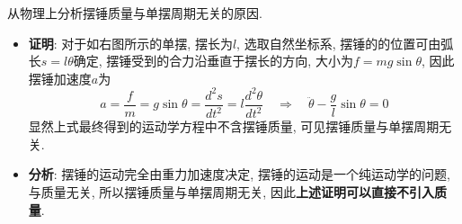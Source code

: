 \begin{problem}[04]
从物理上分析摆锤质量与单摆周期无关的原因.
\end{problem}
\begin{solution}
\begin{minipage}[c]{0.8\linewidth}
\begin{itemize}
\item \textbf{证明}: 对于如右图所示的单摆, 摆长为$l$, 选取自然坐标系, 摆锤的的位置可由弧长$s=l\theta$确定, 摆锤受到的合力沿垂直于摆长的方向, 大小为$f = mg\sin\theta$, 因此摆锤加速度$a$为
\[
a = \frac{f}{m} = g\sin\theta = \frac{d^2s}{dt^2} = l\frac{d^2\theta}{dt^2}
\quad \Longrightarrow \quad \ddot{\theta} -\frac{g}{l}\sin\theta = 0
\]
显然上式最终得到的运动学方程中不含摆锤质量, 可见摆锤质量与单摆周期无关.
\end{itemize}
\end{minipage}
\begin{minipage}[c]{0.2\linewidth}
\begin{center}

\end{center}
\end{minipage}
\begin{itemize}
\item \textbf{分析}: 摆锤的运动完全由重力加速度决定, 摆锤的运动是一个纯运动学的问题, 与质量无关, 所以摆锤质量与单摆周期无关, 因此\textbf{上述证明可以直接不引入质量}.
\end{itemize}
\end{solution}
